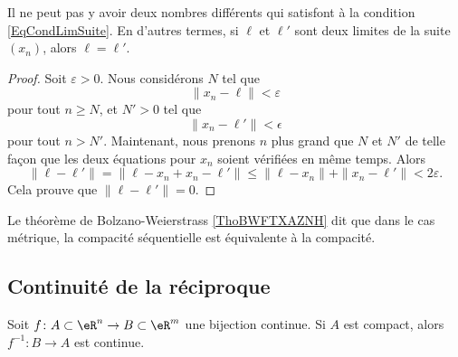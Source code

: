 \begin{lemma}
	Il ne peut pas y avoir deux nombres différents qui satisfont à la condition \eqref{EqCondLimSuite}. En d'autres termes, si $\ell$ et $\ell'$ sont deux limites de la suite $(x_n)$, alors $\ell=\ell'$.
\end{lemma}

\begin{proof}
	Soit $\varepsilon>0$. Nous considérons $N$ tel que
	\begin{equation}
		\| x_n-\ell \|<\varepsilon
	\end{equation}
	pour tout $n\geq N$, et $N'>0$ tel que 
	\begin{equation}
		\| x_n-\ell' \|<\epsilon
	\end{equation}
	pour tout $n>N'$. Maintenant, nous prenons $n$ plus grand que $N$ et $N'$ de telle façon que les deux équations pour $x_n$ soient vérifiées en même temps. Alors
	\begin{equation}
		\| \ell-\ell' \|=\| \ell-x_n+x_n-\ell' \|\leq\| \ell-x_n \|+\| x_n-\ell' \|<2\varepsilon.
	\end{equation}
	Cela prouve que $\| \ell-\ell' \|=0$.
\end{proof}
Le théorème de Bolzano-Weierstrass \ref{ThoBWFTXAZNH} dit que dans le cas métrique, la compacité séquentielle est équivalente à la compacité.


\subsection{Continuité de la réciproque}

\begin{proposition}	\label{PropoInvCompCont}
Soit $f\colon A\subset\eR^n\to B\subset\eR^m$ une bijection continue. Si $A$ est compact, alors $f^{-1}\colon B\to A$ est continue.
\end{proposition}

